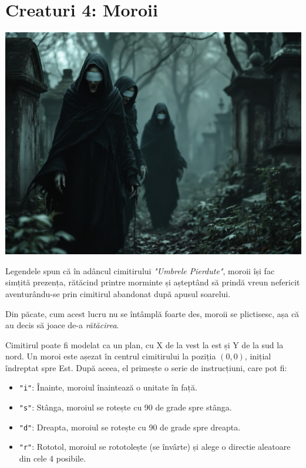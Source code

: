 \documentclass[12pt,a4paper]{article}
\begin{document}


\section*{Creaturi 4: Moroii}


\begin{center}
\includegraphics[scale=0.2]{moroi.jpg}
\end{center}

Legendele spun că în adâncul cimitirului \textit{"Umbrele Pierdute"}, moroii își fac simțită prezența, rătăcind printre morminte și așteptând să prindă vreun nefericit aventurându-se prin cimitirul abandonat după apusul soarelui.

\vspace{1em}

Din păcate, cum acest lucru nu se întâmplă foarte des, moroii se plictisesc, așa că au decis să joace de-a \textit{rătăcirea}.

\vspace{1em}

Cimitirul poate fi modelat ca un plan, cu X de la vest la est și Y de la sud la nord. Un moroi este așezat în centrul cimitirului la poziția $(0, 0)$, inițial îndreptat spre Est. După aceea, el primește o serie de instrucțiuni, care pot fi:

\begin{itemize}
    \item \texttt{"i"}: Înainte, moroiul înaintează o unitate în față.
    \item \texttt{"s"}: Stânga, moroiul se rotește cu 90 de grade spre stânga.
    \item \texttt{"d"}: Dreapta, moroiul se rotește cu 90 de grade spre dreapta.
    \item \texttt{"r"}: Rototol, moroiul se rototolește (se învârte) și alege o directie aleatoare din cele 4 posibile.
\end{itemize}
\end{document}
